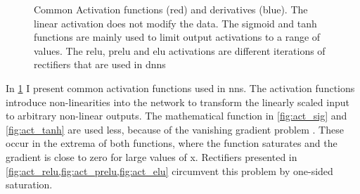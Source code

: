 \begin{figure}
    \caption{Common Activation functions (red) and derivatives (blue). The linear activation does not modify the data. The sigmoid and tanh functions are mainly used to limit output activations to a range of values. The \ac{relu}, \ac{prelu} and \ac{elu} activations are different iterations of rectifiers that are used in \aclp{dnn}}
    \label{fig:activations}
\end{figure}

In \cref{fig:activations} I present common activation functions used in \acp{nn}. The activation functions introduce non-linearities into the network to transform the linearly scaled input to arbitrary non-linear outputs. The mathematical function in \cref{fig:act_sig} and \cref{fig:act_tanh} are used less, because of the vanishing gradient problem \citep{hochreiter1991untersuchungen}. These occur in the extrema of both functions, where the function saturates and the gradient is close to zero for large values of x. Rectifiers presented in \cref{fig:act_relu,fig:act_prelu,fig:act_elu} circumvent this problem by one-sided saturation. 

